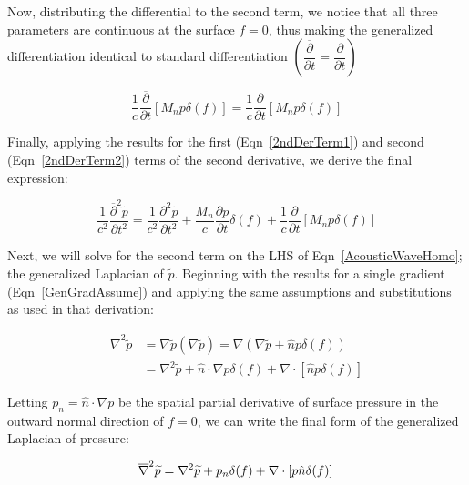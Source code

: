 \documentclass[]{aiaa-tc}%
\begin{document}
Now, distributing the differential to the second term, we notice that all three parameters are continuous at the surface $f=0$, thus making the generalized differentiation identical to standard differentiation $\left(\dfrac{\overline{\partial}}{\partial t} = \dfrac{\partial}{\partial t} \right)$

\begin{equation} \label{2ndDerTerm2}
\dfrac{1}{c}\dfrac{\overline{\partial}}{\partial t}\left[ M_n p\delta(f)\right]
    = \dfrac{1}{c}\dfrac{\partial}{\partial t} \left[ M_n p\delta(f) \right]
\end{equation}

Finally, applying the results for the first (Eqn~\ref{2ndDerTerm1}) and second (Eqn~\ref{2ndDerTerm2}) terms of the second derivative, we derive the final expression:

\begin{equation} \label{2ndDer}
\dfrac{1}{c^2}\dfrac{\overline{\partial}^2\widetilde{p}}{\partial t^2}
= \dfrac{1}{c^2} \dfrac{\partial^2\widetilde{p}}{\partial t^2}
    + \dfrac{M_n}{c} \dfrac{\partial p}{\partial t}  \delta(f)
+ \dfrac{1}{c}\dfrac{\partial}{\partial t} \left[ M_n p\delta(f) \right]
\end{equation}


Next, we will solve for the second term on the LHS of Eqn~\ref{AcousticWaveHomo}; the generalized Laplacian of $\widetilde{p}$.  Beginning with the results for a single gradient (Eqn~\ref{GenGradAssume}) and applying the same assumptions and substitutions as used in that derivation:

\begin{align*}
\overline{\nabla}^2 \widetilde{p}
    &= \overline{\nabla} \widetilde{p}
        \left( \overline{\nabla} \widetilde{p} \right)
    = \overline{\nabla}
        \left( \nabla\widetilde{p} + \hat{n} p \delta(f) \right) \\
&= \nabla^2\widetilde{p} + \hat{n}\cdot\nabla p \delta(f)
    + \nabla\cdot \left[ \hat{n} p \delta(f) \right]
\end{align*}

\noindent Letting $p_n = \hat{n}\cdot\nabla p$ be the spatial partial derivative of surface pressure in the outward normal direction of $f=0$, we can write the final form of the generalized Laplacian of pressure:

\begin{equation} \label{DoubleGrad}
\overline{\nabla}^2 \widetilde{p}
    = \nabla^2\widetilde{p} + p_n \delta(f)
    + \nabla\cdot \left[ p\hat{n} \delta(f) \right] \\
\end{equation}
\end{document}
